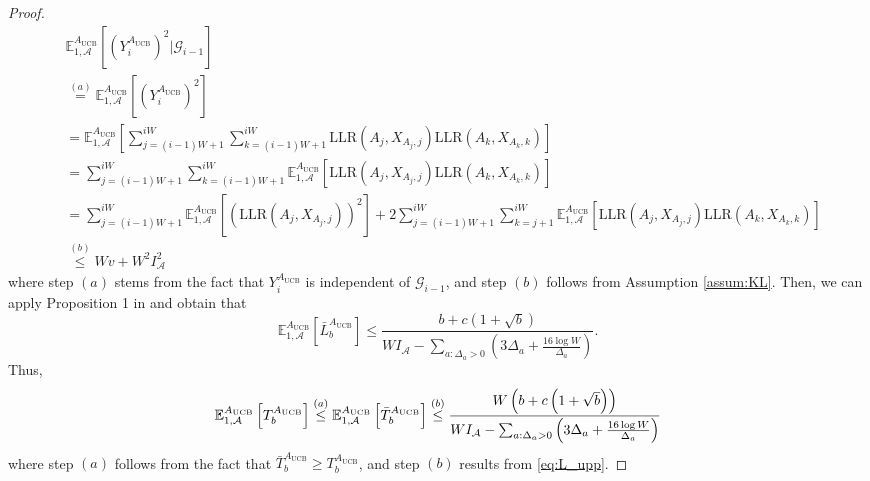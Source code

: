 \documentclass[letterpaper, 10 pt, conference]{ieeeconf}  %
\newcommand{\lp}{\left(}
\newcommand{\rp}{\right)}
\newcommand{\lb}{\left[}
\newcommand{\rb}{\right]}
\newcommand{\mcal}{\mathcal}
\newcommand{\mrm}{\mathrm}
\newcommand{\E}{\mathbb{E}}
\begin{document}
\begin{proof}
%
\begin{align}
    &\E_{1,\mcal{A}}^{A_{\mrm{UCB}}} \lb \lp Y_{i}^{A_{\mrm{UCB}}} \rp^{2} \bigg| \mcal{G}_{i-1} \rb \nonumber\\
    &\overset{(a)}{=} \E_{1,\mcal{A}}^{A_{\mrm{UCB}}} \lb \lp Y_{i}^{A_{\mrm{UCB}}} \rp^{2} \rb \nonumber\\
    &= \E_{1,\mcal{A}}^{A_{\mrm{UCB}}} \lb \sum_{j=(i-1)W + 1}^{iW} \sum_{k=(i-1)W + 1}^{iW} \mrm{LLR}\lp A_{j}, X_{A_{j}, j}\rp \mrm{LLR}\lp A_{k}, X_{A_{k}, k}\rp \rb \nonumber\\
    &= \sum_{j=(i-1)W + 1}^{iW} \sum_{k=(i-1)W + 1}^{iW} \E_{1,\mcal{A}}^{A_{\mrm{UCB}}} \lb \mrm{LLR}\lp A_{j}, X_{A_{j}, j}\rp \mrm{LLR}\lp A_{k}, X_{A_{k}, k}\rp \rb \nonumber\\
    &= \sum_{j=(i-1)W + 1}^{iW} \E_{1,\mcal{A}}^{A_{\mrm{UCB}}} \lb \lp\mrm{LLR}\lp A_{j}, X_{A_{j}, j}\rp\rp^{2} \rb + 2\sum_{j=(i-1)W + 1}^{iW} \sum_{k=j+1}^{iW} \E_{1,\mcal{A}}^{A_{\mrm{UCB}}} \lb \mrm{LLR}\lp A_{j}, X_{A_{j}, j}\rp \mrm{LLR}\lp A_{k}, X_{A_{k}, k}\rp \rb \nonumber \\
    &\overset{(b)}{\leq} Wv + W^{2}I_{\mcal{A}}^{2}
\end{align}
%
where step $(a)$ stems from the fact that $Y_{i}^{A_{\mrm{UCB}}}$ is independent of $\mcal{G}_{i-1}$, and step $(b)$ follows from Assumption \ref{assum:KL}. Then, we can apply Proposition 1 in \cite{veeravalli2024quickest} and obtain that 
%
\begin{equation}\label{eq:L_upp}
    \E_{1,\mcal{A}}^{A_{\mrm{UCB}}} \lb \bar{L}_{b}^{A_{\mrm{UCB}}} \rb \leq \frac{b + c \lp 1 + \sqrt{b} \rp}{WI_{\mcal{A}} -  \sum_{a: \Delta_{a} > 0} \lp 3\Delta_{a} + \frac{16 \log W}{\Delta_{a}} \rp}.
\end{equation}
%
Thus, 
%
\begin{equation}\label{eq:final_upp}
    \E_{1,\mcal{A}}^{A_{\mrm{UCB}}} \lb T_{b}^{A_{\mrm{UCB}}} \rb \overset{(a)}{\leq} \E_{1,\mcal{A}}^{A_{\mrm{UCB}}} \lb \Bar{T}_{b}^{A_{\mrm{UCB}}} \rb \overset{(b)}{\leq} \frac{W \lp b + c \lp 1 + \sqrt{b} \rp \rp}{WI_{\mcal{A}} - \sum_{a: \Delta_{a} > 0} \lp 3\Delta_{a} + \frac{16 \log W}{\Delta_{a}} \rp}
\end{equation}
%
where step $(a)$ follows from the fact that $\bar{T}_{b}^{A_{\mrm{UCB}}} \geq T_{b}^{A_{\mrm{UCB}}}$, and step $(b)$ results from \eqref{eq:L_upp}.
\end{proof}
\end{document}
